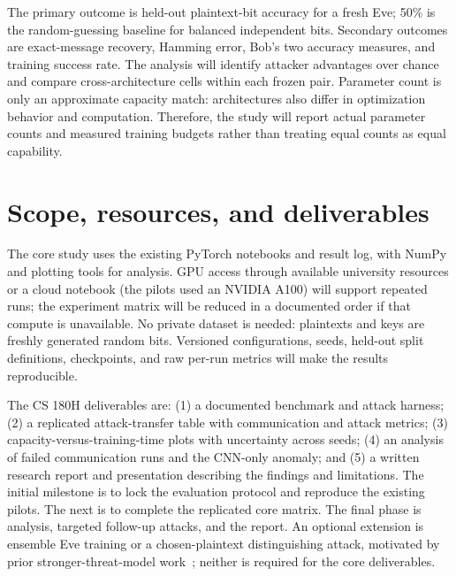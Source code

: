 \documentclass[10pt,letterpaper]{article}
\begin{document}
The primary outcome is held-out plaintext-bit accuracy for a fresh Eve; 50\% is the random-guessing baseline for balanced independent bits. Secondary outcomes are exact-message recovery, Hamming error, Bob's two accuracy measures, and training success rate. The analysis will identify attacker advantages over chance and compare cross-architecture cells within each frozen pair. Parameter count is only an approximate capacity match: architectures also differ in optimization behavior and computation. Therefore, the study will report actual parameter counts and measured training budgets rather than treating equal counts as equal capability.

\section{Scope, resources, and deliverables}
The core study uses the existing PyTorch notebooks and result log, with NumPy and plotting tools for analysis. GPU access through available university resources or a cloud notebook (the pilots used an NVIDIA A100) will support repeated runs; the experiment matrix will be reduced in a documented order if that compute is unavailable. No private dataset is needed: plaintexts and keys are freshly generated random bits. Versioned configurations, seeds, held-out split definitions, checkpoints, and raw per-run metrics will make the results reproducible.

The CS 180H deliverables are: (1) a documented benchmark and attack harness; (2) a replicated attack-transfer table with communication and attack metrics; (3) capacity-versus-training-time plots with uncertainty across seeds; (4) an analysis of failed communication runs and the CNN-only anomaly; and (5) a written research report and presentation describing the findings and limitations. The initial milestone is to lock the evaluation protocol and reproduce the existing pilots. The next is to complete the replicated core matrix. The final phase is analysis, targeted follow-up attacks, and the report. An optional extension is ensemble Eve training or a chosen-plaintext distinguishing attack, motivated by prior stronger-threat-model work~\cite{coutinho2018}; neither is required for the core deliverables.
\end{document}
